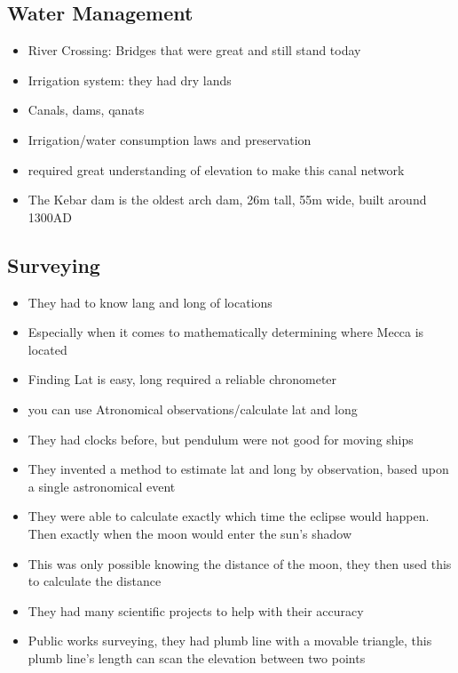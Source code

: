 \documentclass{article}
\begin{document}
\subsection{Water Management}
\begin{itemize}
  \item River Crossing:
    Bridges that were great and still stand today
  \item Irrigation system: they had dry lands
  \item Canals, dams, qanats
  \item Irrigation/water consumption laws and preservation
  \item required great understanding of elevation to make this canal network
  \item The Kebar dam is the oldest arch dam, 26m tall, 55m wide, built around 1300AD
\end{itemize}

\subsection{Surveying}
\begin{itemize}
  \item They had to know lang and long of locations
  \item Especially when it comes to mathematically determining where Mecca is located
  \item Finding Lat is easy, long required a reliable chronometer
  \item you can use Atronomical observations/calculate lat and long
  \item They had clocks before, but pendulum were not good for moving ships
  \item They invented a method to estimate lat and long by observation, based upon
    a single astronomical event
  \item They were able to calculate exactly which time the eclipse would happen.
    Then exactly when the moon would enter the sun's shadow
  \item This was only possible knowing the distance of the moon, they then used this to calculate the distance
  \item They had many scientific projects to help with their accuracy
  \item Public works surveying, they had plumb line with a movable triangle,
    this plumb line's length can scan the elevation between two points
\end{itemize}
\end{document}
